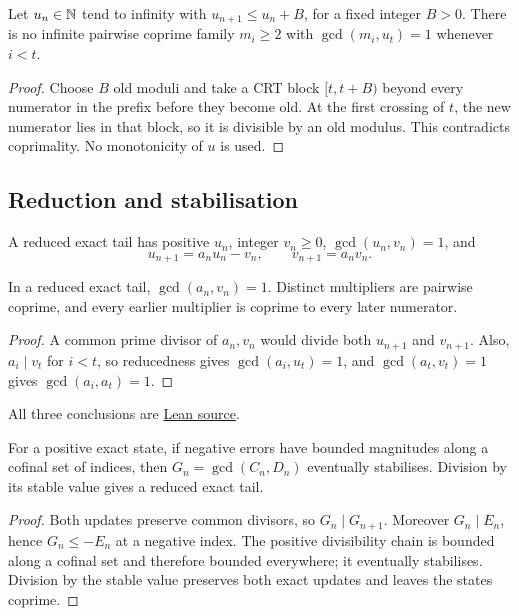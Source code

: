 \documentclass[11pt]{article}
\begin{document}
\begin{theorem}\label{res:barrier}
Let $u_n\in\mathbb{N}$ tend to infinity with $u_{n+1}\le u_n+B$, for a fixed
integer $B>0$. There is no infinite pairwise coprime family $m_i\ge2$
with $\gcd(m_i,u_t)=1$ whenever $i<t$.
\end{theorem}
\begin{proof}
Choose $B$ old moduli and take a CRT block $[t,t+B)$ beyond every numerator
in the prefix before they become old. At the first crossing of $t$, the
new numerator lies in that block, so it is divisible by an old modulus.
This contradicts coprimality. No monotonicity of $u$ is used.
\end{proof}

\subsection{Reduction and stabilisation}
A reduced exact tail has positive $u_n$, integer $v_n\ge0$,
$\gcd(u_n,v_n)=1$, and
\[
 u_{n+1}=a_nu_n-v_n,\qquad v_{n+1}=a_nv_n.
\]
\begin{proposition}\label{res:reduced}
In a reduced exact tail, $\gcd(a_n,v_n)=1$. Distinct multipliers are
pairwise coprime, and every earlier multiplier is coprime to every later
numerator.
\end{proposition}
\begin{proof}
A common prime divisor of $a_n,v_n$ would divide both $u_{n+1}$ and
$v_{n+1}$. Also, $a_i\mid v_t$ for $i<t$, so reducedness gives
$\gcd(a_i,u_t)=1$, and $\gcd(a_t,v_t)=1$ gives
$\gcd(a_i,a_t)=1$.
\end{proof}

\noindent All three conclusions are
\href{https://github.com/wcook04/plectis-erdos/blob/f36a98bf3d3e6f65f1074e3b800e3293d5b8a51a/ErdosProblems/Erdos243/PaperCompleteR7/Reduction.lean#L16}{Lean source}.

\begin{proposition}\label{res:gcdstab}
For a positive exact state, if negative errors have bounded magnitudes
along a cofinal set of indices, then $G_n=\gcd(C_n,D_n)$ eventually
stabilises. Division by its stable value gives a reduced exact tail.
\end{proposition}
\begin{proof}
Both updates preserve common divisors, so $G_n\mid G_{n+1}$. Moreover
$G_n\mid E_n$, hence $G_n\le -E_n$ at a negative index. The positive
divisibility chain is bounded along a cofinal set and therefore bounded
everywhere; it eventually stabilises. Division by the stable value
preserves both exact updates and leaves the states coprime.
\end{proof}
\end{document}
